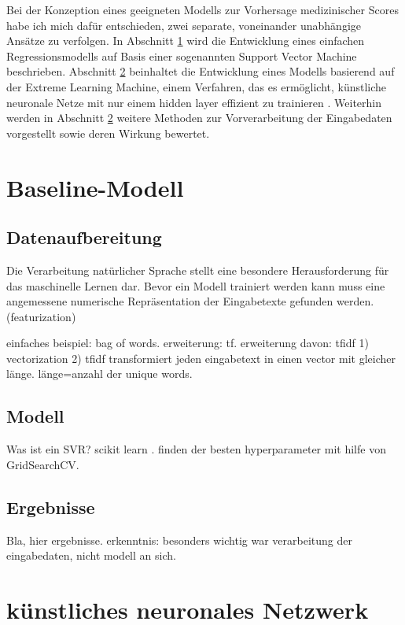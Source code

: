 Bei der Konzeption eines geeigneten Modells zur Vorhersage medizinischer Scores habe ich mich dafür entschieden, zwei separate, voneinander unabhängige Ansätze zu verfolgen. In Abschnitt \ref{section:baseline} wird die Entwicklung eines einfachen Regressionsmodells auf Basis einer sogenannten Support Vector Machine beschrieben. Abschnitt \ref{section:ELM} beinhaltet die Entwicklung eines Modells basierend auf der Extreme Learning Machine, einem Verfahren, das es ermöglicht, künstliche neuronale Netze mit nur einem hidden layer effizient zu trainieren \citep{huangExtremeLearningMachine2006}. Weiterhin werden in Abschnitt \ref{section:ELM} weitere Methoden zur Vorverarbeitung der Eingabedaten vorgestellt sowie deren Wirkung bewertet. 

\section{Baseline-Modell}\label{section:baseline}

\subsection{Datenaufbereitung}
Die Verarbeitung natürlicher Sprache stellt eine besondere Herausforderung für das maschinelle Lernen dar.
Bevor ein Modell trainiert werden kann muss eine angemessene numerische Repräsentation der Eingabetexte gefunden werden. (featurization)

einfaches beispiel: bag of words. erweiterung: tf. erweiterung davon: tfidf
1) vectorization
2) tfidf transformiert jeden eingabetext in einen vector mit gleicher länge. länge=anzahl der unique words.
\subsection{Modell}

Was ist ein SVR?
scikit learn \citep{JMLR:v12:pedregosa11a}.
finden der besten hyperparameter mit hilfe von GridSearchCV.

\subsection{Ergebnisse}
Bla, hier ergebnisse. erkenntnis: besonders wichtig war verarbeitung der eingabedaten, nicht modell an sich.

\section{künstliches neuronales Netzwerk}\label{section:ELM}
